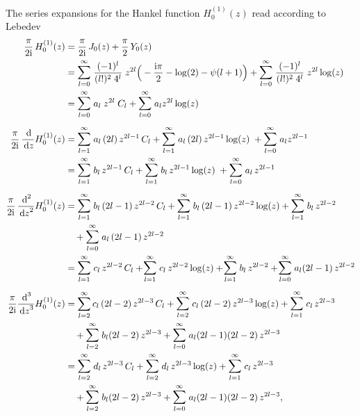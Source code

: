 \newpage
The series expansions for the Hankel function $H_0^{(1)}(z)$ read according to Lebedev  \cite{lebedev}
\begin{align*}
  \frac{\pi}{2 \ii} \, H_0^{(1)}(z)
  &= \frac{\pi}{2\ii} \, J_0(z) + \frac{\pi}{2}\, Y_0(z) \\
  &= \mathlarger{\sum}_{l = 0}^\infty \; \frac{(-1)^l}{(l!)^2 \; 4^l} \;  z^{2l} \Big( -\frac{\ii \pi}{2} - \log(2) - \psi(l + 1) \Big) 
  +  \mathlarger{\sum}_{l = 0}^\infty \; \frac{(-1)^l}{(l!)^2 \; 4^l} \;  z^{2l} \log(z) \\
  &= \mathlarger{\sum}_{l = 0}^\infty \; a_l \;  z^{2l} \; C_l 
  + \mathlarger{\sum}_{l = 0}^\infty \; a_l z^{2l} \log(z) \\[0.5em]
  \frac{\pi}{2\ii} \, \frac{\d{}}{\d z} H_0^{(1)}(z)
  &= \mathlarger{\sum}_{l = 1}^\infty \; a_l \,  (2l) \, z^{2l - 1} \, C_l 
  + \mathlarger{\sum}_{l = 1}^\infty \; a_l \, (2l)  \, z^{2l - 1} \log(z) \; 
  + \mathlarger{\sum}_{l = 0}^\infty \; a_l z^{2l - 1} \\
  &= \mathlarger{\sum}_{l = 1}^\infty \; b_l \, z^{2l - 1} \, C_l 
  + \mathlarger{\sum}_{l = 1}^\infty \; b_l \, z^{2l - 1} \log(z) \; 
  +  \mathlarger{\sum}_{l = 0}^\infty \; a_l \, z^{2l - 1} \\[0.5em]
  \frac{\pi}{2\ii} \, \frac{\d{}^2}{\d z^2} H_0^{(1)}(z)
  &= \mathlarger{\sum}_{l = 1}^\infty \; b_l \, (2l - 1) \, z^{2l - 2} \, C_l 
  + \mathlarger{\sum}_{l = 1}^\infty \; b_l \, (2l - 1)\, z^{2l - 2} \log(z) 
  + \mathlarger{\sum}_{l = 1}^\infty \; b_l \, z^{2l - 2}\\
  &\quad + \mathlarger{\sum}_{l = 0}^\infty \; a_l \, (2l - 1) \, z^{2l - 2} \\
  &= \mathlarger{\sum}_{l = 1}^\infty \; c_l \, z^{2l - 2} \, C_l 
  +  \!\mathlarger{\sum}_{l = 1}^\infty \; c_l \, z^{2l - 2} \log(z) 
  +  \!\mathlarger{\sum}_{l = 1}^\infty \; b_l \, z^{2l - 2} 
  +  \!\mathlarger{\sum}_{l = 0}^\infty \; a_l (2l - 1) \, z^{2l - 2} \\[0.5em]
  \frac{\pi}{2\ii} \frac{\d{}^3}{\d z^3} H_0^{(1)}(z)
  &= \sum_{l = 2}^\infty c_l \, (2l - 2) \, z^{2l - 3} \, C_l 
  +  \mathlarger{\sum}_{l = 2}^\infty \; c_l \, (2l - 2) \, z^{2l - 3} \log(z) 
  +  \mathlarger{\sum}_{l = 1}^\infty \; c_l \, z^{2l - 3} \\
 &\quad  
  + \mathlarger{\sum}_{l = 2}^\infty \; b_l (2l - 2) \, z^{2l - 3} 
  + \mathlarger{\sum}_{l = 0}^\infty \; a_l (2l - 1) (2l - 2) \, z^{2l - 3} \\
  &= \mathlarger{\sum}_{l = 2}^\infty \; d_l \, z^{2l - 3} \, C_l 
  + \mathlarger{\sum}_{l = 2}^\infty \; d_l \, z^{2l - 3} \log(z) 
  + \mathlarger{\sum}_{l = 1}^\infty \; c_l \, z^{2l - 3} \\
 &\quad  + \mathlarger{\sum}_{l = 2}^\infty \; b_l (2l - 2) \, z^{2l - 3} 
  + \mathlarger{\sum}_{l = 0}^\infty \; a_l (2l - 1) (2l - 2) \, z^{2l - 3} ,
\end{align*}
